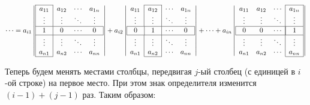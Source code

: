 $$
\cdots =
a_{i1}\left|
\begin{array}{|c|ccc}
\cline{1-1}
a_{11} & a_{12} & \cdots & a_{1n} \\
\vdots & \vdots & \ddots & \vdots \\
\hline
\multicolumn{1}{|c|}{1} & 0 & \cdots &\multicolumn{1}{c|}{0}\\
\hline
\vdots & \vdots & \ddots & \vdots \\
a_{n1} & a_{n2} & \cdots & a_{nn} \\
\cline{1-1}
\end{array}\right|
+
a_{i2}\left|
\begin{array}{c|c|cc}
\cline{2-2}
a_{11} & a_{12} & \cdots & a_{1n} \\
\vdots & \vdots & \ddots & \vdots \\
\hline
\multicolumn{1}{|c}{0} & \multicolumn{1}{|c|}{1} & \cdots &\multicolumn{1}{c|}{0}\\
\hline
\vdots & \vdots & \ddots & \vdots \\
a_{n1} & a_{n2} & \cdots & a_{nn} \\
\cline{2-2}
\end{array}\right|
+
\cdots
+
a_{in}\left|
\begin{array}{ccc|c|}
\cline{4-4}
a_{11} & a_{12} & \cdots & a_{1n} \\
\vdots & \vdots & \ddots & \vdots \\
\hline
\multicolumn{1}{|c}{0} & 0 & \cdots &\multicolumn{1}{|c|}{1}\\
\hline
\vdots & \vdots & \ddots & \vdots \\
a_{n1} & a_{n2} & \cdots & a_{nn} \\
\cline{4-4}
\end{array}\right|
$$

Теперь будем менять местами столбцы, передвигая $j$-ый столбец (с
единицей в $i$-ой строке) на первое место. При этом знак определителя
изменится $(i-1)+(j-1)$ раз. Таким образом:

